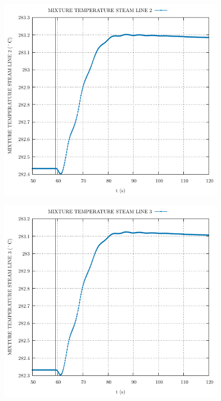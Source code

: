 \documentclass{article}
\begin{document}
\begin{multicols}{2}
\begin{figure}[H]
\end{figure}
\begin{figure}[H]
\centering
\includegraphics[width=\linewidth]{./graphs/MIXTURE TEMPERATURE STEAM LINE 2_comp.pdf}
\end{figure}
\begin{figure}[H]
\centering
\includegraphics[width=\linewidth]{./graphs/MIXTURE TEMPERATURE STEAM LINE 3_comp.pdf}

\end{figure}
\end{multicols}
\end{document}
